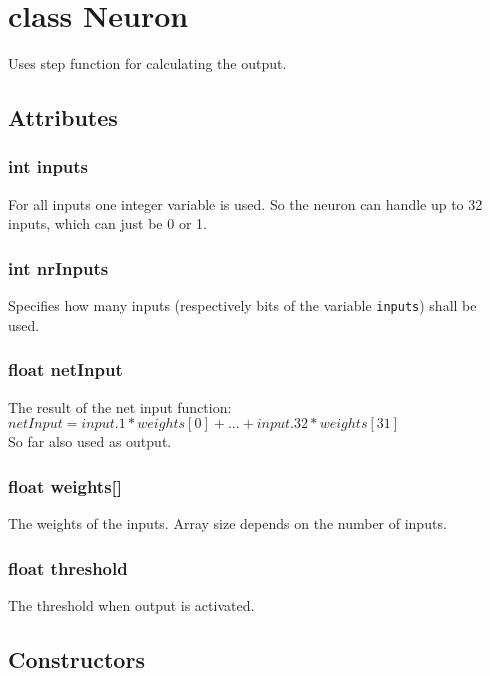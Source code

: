 \chapter{class Neuron}
Uses step function for calculating the output.

\section{Attributes}
\subsection{int inputs}
For all inputs one integer variable is used. So the neuron can handle up to 32 inputs, which can just be 0 or 1.

\subsection{int nrInputs}
Specifies how many inputs (respectively bits of the variable \texttt{inputs}) shall be used.

\subsection{float netInput}
The result of the net input function:\\
$netInput = input.1*weights[0] + ... + input.32*weights[31]$\\
So far also used as output.

\subsection{float weights[]}
The weights of the inputs. Array size depends on the number of inputs.

\subsection{float threshold}
The threshold when output is activated.


\section{Constructors}

